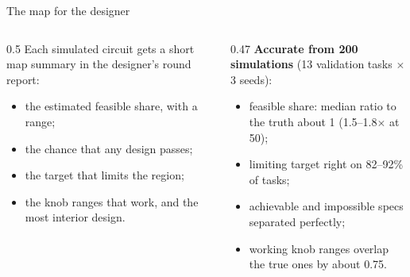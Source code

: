 \begin{frame}{The map for the designer}
  \begin{columns}[T]
    \begin{column}{0.5\textwidth}
      \small
      Each simulated circuit gets a short \alert{map summary} in the designer's round report:
      \begin{itemize}
        \item the estimated feasible share, with a range;
        \item the chance that any design passes;
        \item the target that limits the region;
        \item the knob ranges that work, and the most interior design.
      \end{itemize}
    \end{column}
    \begin{column}{0.47\textwidth}
      \small
      \textbf{Accurate from 200 simulations} (13 validation tasks $\times$ 3 seeds):
      \begin{itemize}
        \item feasible share: median ratio to the truth about 1 (1.5--1.8$\times$ at 50);
        \item limiting target right on 82--92\% of tasks;
        \item achievable and impossible specs separated perfectly;
        \item working knob ranges overlap the true ones by about 0.75.
      \end{itemize}
    \end{column}
  \end{columns}
\end{frame}


